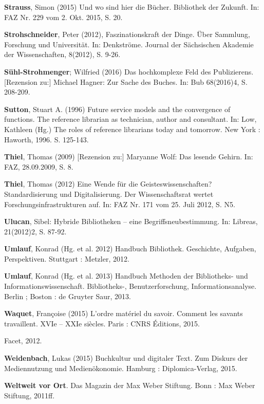 \documentclass[a4paper,
fontsize=11pt,
oneside,
numbers=noperiodatend,
parskip=half-,
bibliography=totoc,
final
]{scrartcl}
\begin{document}
\textbf{Strauss}, Simon (2015) Und wo sind hier die Bücher. Bibliothek
der Zukunft. In: FAZ Nr. 229 vom 2. Okt. 2015, S. 20.

\textbf{Strohschneider}, Peter (2012), Faszinationskraft der Dinge. Über
Sammlung, Forschung und Universität. In: Denkströme. Journal der
Sächsischen Akademie der Wissenschaften, 8(2012), S. 9-26.

\textbf{Sühl-Strohmenger}; Wilfried (2016) Das hochkomplexe Feld des
Publizierens. {[}Rezension zu:{]} Michael Hagner: Zur Sache des Buches.
In: Bub 68(2016)4, S. 208-209.

\textbf{Sutton}, Stuart A. (1996) Future service models and the
convergence of functions. The reference librarian as technician, author
and consultant. In: Low, Kathleen (Hg.) The roles of reference
librarians today and tomorrow. New York : Haworth, 1996. S. 125-143.

\textbf{Thiel}, Thomas (2009) {[}Rezension zu:{]} Maryanne Wolf: Das
lesende Gehirn. In: FAZ, 28.09.2009, S. 8.

\textbf{Thiel}, Thomas (2012) Eine Wende für die Geisteswissenschaften?
Standardisierung und Digitalisierung. Der Wissenschaftsrat wertet
Forschungsinfrastrukturen auf. In: FAZ Nr. 171 vom 25. Juli 2012, S. N5.

\textbf{Ulucan}, Sibel: Hybride Bibliotheken -- eine
Begriffsneubestimmung. In: Libreas, 21(2012)2, S. 87-92.

\textbf{Umlauf}, Konrad (Hg. et al. 2012) Handbuch Bibliothek.
Geschichte, Aufgaben, Perspektiven. Stuttgart : Metzler, 2012.

\textbf{Umlauf}, Konrad (Hg. et al. 2013) Handbuch Methoden der
Bibliotheks- und Informationswissenschaft. Bibliotheks-,
Benutzerforschung, Informationsanalyse. Berlin ; Boston : de Gruyter
Saur, 2013.

\textbf{Waquet}, Françoise (2015) L'ordre matériel du savoir. Comment
les savants travaillent. XVIe -- XXIe siècles. Paris : CNRS Éditions,
2015.

\begin{description}
\tightlist
\item[\textbf{Warwick}, Claire (Hg. 2012), Digital Humanities in
practice. London]
Facet, 2012.
\end{description}

\textbf{Weidenbach}, Lukas (2015) Buchkultur und digitaler Text. Zum
Diskurs der Mediennutzung und Medienökonomie. Hamburg :
Diplomica-Verlag, 2015.

\textbf{Weltweit vor Ort}. Das Magazin der Max Weber Stiftung. Bonn :
Max Weber Stiftung, 2011ff.
\end{document}
